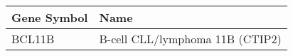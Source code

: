 \begin{tabular}{ll}
\toprule
Gene Symbol &                             Name \\
\midrule
     BCL11B & B-cell CLL/lymphoma 11B  (CTIP2) \\
\bottomrule
\end{tabular}
